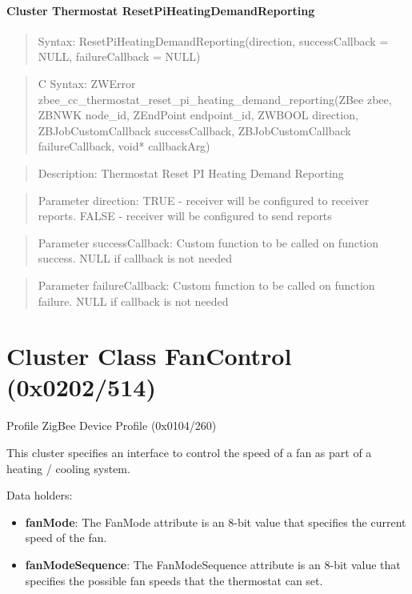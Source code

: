 \paragraph{Cluster Thermostat ResetPiHeatingDemandReporting}
\begin{quote}Syntax: ResetPiHeatingDemandReporting(direction, successCallback = NULL, failureCallback = NULL)\end{quote}
\begin{quote}C Syntax: ZWError zbee\_cc\_thermostat\_reset\_pi\_heating\_demand\_reporting(ZBee zbee, ZBNWK node\_id, ZEndPoint endpoint\_id, ZWBOOL direction, ZBJobCustomCallback successCallback, ZBJobCustomCallback failureCallback, void* callbackArg)\end{quote}
\begin{quote}Description: Thermostat Reset PI Heating Demand Reporting\end{quote}
\begin{quote}Parameter direction: TRUE  - receiver will be configured to receiver reports. FALSE - receiver will be configured to send reports\end{quote}
\begin{quote}Parameter successCallback: Custom function to be called on function success. NULL if callback is not needed\end{quote}
\begin{quote}Parameter failureCallback: Custom function to be called on function failure. NULL if callback is not needed\end{quote}



\section{Cluster Class FanControl (0x0202/514)}

Profile ZigBee Device Profile (0x0104/260)

This cluster specifies an interface to control the speed of a fan as part of a heating / cooling system.
\newline

\noindent
Data holders:

\begin{itemize}
\item \textbf{fanMode}:         The FanMode attribute is an 8-bit value that specifies the current speed of the fan.
\item \textbf{fanModeSequence}: The FanModeSequence attribute is an 8-bit value that specifies the possible fan speeds that the thermostat can set.
\end{itemize}

